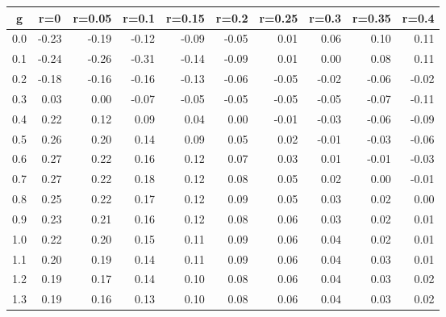 %
\begin{table}[!tbp]
 \begin{center}
 \begin{tabular}{rrrrrrrrrr}\hline\hline
\multicolumn{1}{c}{g}&\multicolumn{1}{c}{r=0}&\multicolumn{1}{c}{r=0.05}&\multicolumn{1}{c}{r=0.1}&\multicolumn{1}{c}{r=0.15}&\multicolumn{1}{c}{r=0.2}&\multicolumn{1}{c}{r=0.25}&\multicolumn{1}{c}{r=0.3}&\multicolumn{1}{c}{r=0.35}&\multicolumn{1}{c}{r=0.4}\tabularnewline
\hline
0.0&-0.23&-0.19&-0.12&-0.09&-0.05& 0.01& 0.06& 0.10& 0.11\tabularnewline
0.1&-0.24&-0.26&-0.31&-0.14&-0.09& 0.01& 0.00& 0.08& 0.11\tabularnewline
0.2&-0.18&-0.16&-0.16&-0.13&-0.06&-0.05&-0.02&-0.06&-0.02\tabularnewline
0.3& 0.03& 0.00&-0.07&-0.05&-0.05&-0.05&-0.05&-0.07&-0.11\tabularnewline
0.4& 0.22& 0.12& 0.09& 0.04& 0.00&-0.01&-0.03&-0.06&-0.09\tabularnewline
0.5& 0.26& 0.20& 0.14& 0.09& 0.05& 0.02&-0.01&-0.03&-0.06\tabularnewline
0.6& 0.27& 0.22& 0.16& 0.12& 0.07& 0.03& 0.01&-0.01&-0.03\tabularnewline
0.7& 0.27& 0.22& 0.18& 0.12& 0.08& 0.05& 0.02& 0.00&-0.01\tabularnewline
0.8& 0.25& 0.22& 0.17& 0.12& 0.09& 0.05& 0.03& 0.02& 0.00\tabularnewline
0.9& 0.23& 0.21& 0.16& 0.12& 0.08& 0.06& 0.03& 0.02& 0.01\tabularnewline
1.0& 0.22& 0.20& 0.15& 0.11& 0.09& 0.06& 0.04& 0.02& 0.01\tabularnewline
1.1& 0.20& 0.19& 0.14& 0.11& 0.09& 0.06& 0.04& 0.03& 0.01\tabularnewline
1.2& 0.19& 0.17& 0.14& 0.10& 0.08& 0.06& 0.04& 0.03& 0.02\tabularnewline
1.3& 0.19& 0.16& 0.13& 0.10& 0.08& 0.06& 0.04& 0.03& 0.02\tabularnewline
\hline
\end{tabular}

\end{center}

\end{table}

